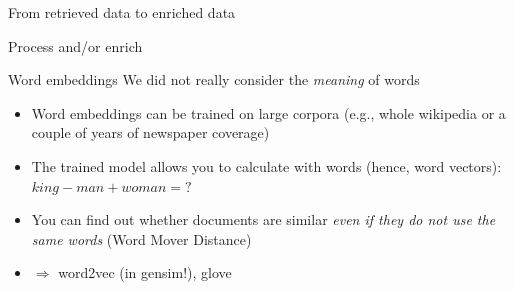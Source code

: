 \documentclass{beamer}
\begin{document}
\begin{frame}{From retrieved data to enriched data}
\end{frame}




\begin{frame}{Process and/or enrich}
	\begin{block}{Word embeddings}
	We did not really consider the \emph{meaning} of words
		\begin{itemize}
		\item Word embeddings can be trained on large corpora (e.g., whole wikipedia or a couple of years of newspaper coverage) 
		\item The trained model allows you to calculate with words (hence, word vectors): $king-man+woman = ?$ 
		\item You can find out whether documents are similar \emph{even if they do not use the same words} (Word Mover Distance)
		\item $\Rightarrow$ word2vec (in gensim!), glove
		\end{itemize}
	\end{block}
\end{frame}
\end{document}
